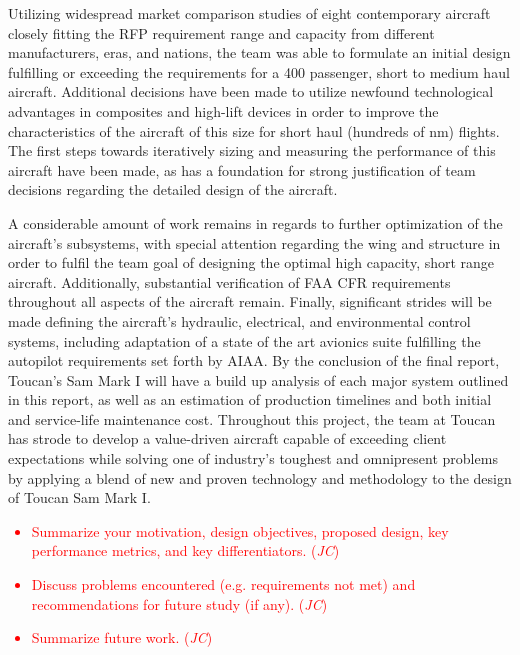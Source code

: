 Utilizing widespread market comparison studies of eight contemporary aircraft closely fitting the RFP requirement range and capacity from different manufacturers, eras, and nations, the team was able to formulate an initial design fulfilling or exceeding the requirements for a 400 passenger, short to medium haul aircraft. Additional decisions have been made to utilize newfound technological advantages in composites and high-lift devices in order to improve the characteristics of the aircraft of this size for short haul (hundreds of nm) flights.  The first steps towards iteratively sizing and measuring the performance of this aircraft have been made, as has a foundation for strong justification of team decisions regarding the detailed design of the aircraft.

A considerable amount of work remains in regards to further optimization of the aircraft's subsystems, with special attention regarding the wing and structure in order to fulfil the team goal of designing the optimal high capacity, short range aircraft.  Additionally, substantial verification of FAA CFR requirements throughout all aspects of the aircraft remain.  Finally, significant strides will be made defining the aircraft's hydraulic, electrical, and environmental control systems, including adaptation of a state of the art avionics suite fulfilling the autopilot requirements set forth by AIAA.  By the conclusion of the final report, Toucan's Sam Mark I will have a build up analysis of each major system outlined in this report, as well as an estimation of production timelines and both initial and service-life maintenance cost.  Throughout this project, the team at Toucan has strode to develop a value-driven aircraft capable of exceeding client expectations while solving one of industry's toughest and omnipresent problems by applying a blend of new and proven technology and methodology to the design of Toucan Sam Mark I.  



\textcolor{red}{
\begin{itemize}
    \item Summarize your motivation, design objectives, proposed design, key performance metrics, and key differentiators. \checkmark (\textit{JC})
    \item Discuss problems encountered (e.g. requirements not met) and recommendations for future study (if any). \checkmark (\textit{JC})
    \item Summarize future work. \checkmark (\textit{JC})
\end{itemize}}